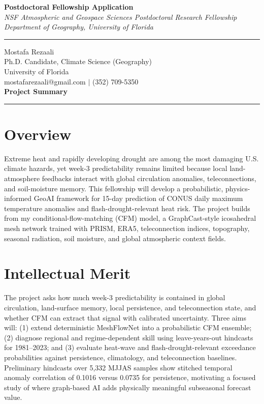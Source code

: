 \documentclass[11pt,letterpaper]{article}
\begin{document}
\begin{center}
    \vspace*{-1.5cm}
    {\Large\bfseries Postdoctoral Fellowship Application} \\[0.2cm]
    {\small\textit{NSF Atmospheric and Geospace Sciences Postdoctoral Research Fellowship}} \\[0.05cm]
    {\small\textit{Department of Geography, University of Florida}} \\[0.1cm]
    \rule{0.6\textwidth}{0.4pt}
\end{center}
\vspace{-0.5cm}

\noindent
Mostafa Rezaali \\
Ph.D. Candidate, Climate Science (Geography) \\
University of Florida \\
mostafarezaali@gmail.com \quad $\mid$ \quad (352) 709-5350 \\[0.3cm]
{\large\bfseries Project Summary}\\[-0.15cm]
\rule{\textwidth}{0.4pt}

\small
{}
\vspace{-0.15cm}
\section*{Overview}
Extreme heat and rapidly developing drought are among the most damaging U.S. climate hazards, yet week-3 predictability remains limited because local land-atmosphere feedbacks interact with global circulation anomalies, teleconnections, and soil-moisture memory. This fellowship will develop a probabilistic, physics-informed GeoAI framework for 15-day prediction of CONUS daily maximum temperature anomalies and flash-drought-relevant heat risk. The project builds from my conditional-flow-matching (CFM) model, a GraphCast-style icosahedral mesh network trained with PRISM, ERA5, teleconnection indices, topography, seasonal radiation, soil moisture, and global atmospheric context fields.

\section*{Intellectual Merit}
The project asks how much week-3 predictability is contained in global circulation, land-surface memory, local persistence, and teleconnection state, and whether CFM can extract that signal with calibrated uncertainty. Three aims will: (1) extend deterministic MeshFlowNet into a probabilistic CFM ensemble; (2) diagnose regional and regime-dependent skill using leave-years-out hindcasts for 1981--2023; and (3) evaluate heat-wave and flash-drought-relevant exceedance probabilities against persistence, climatology, and teleconnection baselines. Preliminary hindcasts over 5,332 MJJAS samples show stitched temporal anomaly correlation of 0.1016 versus 0.0735 for persistence, motivating a focused study of where graph-based AI adds physically meaningful subseasonal forecast value.
\end{document}

